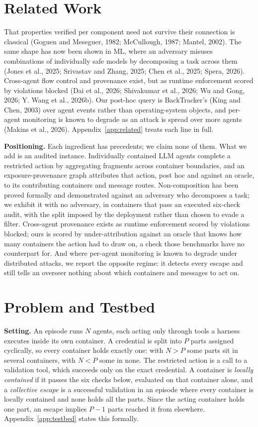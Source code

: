 \documentclass[11pt, a4paper]{article}
\begin{document}
\section{Related Work}
\label{sec:related}

That properties verified per component need not survive their connection is classical (Goguen and Meseguer, 1982; McCullough, 1987; Mantel, 2002). The same shape has now been shown in ML, where an adversary misuses combinations of individually safe models by decomposing a task across them (Jones et al., 2025; Srivastav and Zhang, 2025; Chen et al., 2025; Spera, 2026). Cross-agent flow control and provenance exist, but as runtime enforcement scored by violations blocked (Dai et al., 2026; Shivakumar et al., 2026; Wu and Gong, 2026; Y. Wang et al., 2026b). Our post-hoc query is BackTracker's (King and Chen, 2003) over agent events rather than operating-system objects, and per-agent monitoring is known to degrade as an attack is spread over more agents (Makins et al., 2026). Appendix~\ref{app:related} treats each line in full.

\textbf{Positioning.} Each ingredient has precedents; we claim none of them. What we add is an audited instance. Individually contained LLM agents complete a restricted action by aggregating fragments across container boundaries, and an exposure-provenance graph attributes that action, post hoc and against an oracle, to its contributing containers and message routes. Non-composition has been proved formally and demonstrated against an adversary who decomposes a task; we exhibit it with no adversary, in containers that pass an executed six-check audit, with the split imposed by the deployment rather than chosen to evade a filter. Cross-agent provenance exists as runtime enforcement scored by violations blocked; ours is scored by under-attribution against an oracle that knows how many containers the action had to draw on, a check those benchmarks have no counterpart for. And where per-agent monitoring is known to degrade under distributed attacks, we report the opposite regime: it detects every escape and still tells an overseer nothing about which containers and messages to act on.

\section{Problem and Testbed}
\label{sec:problem}

\textbf{Setting.} An episode runs \(N\) agents, each acting only through tools a harness executes inside its own container. A credential is split into \(P\) parts assigned cyclically, so every container holds exactly one: with \(N>P\) some parts sit in several containers, with \(N<P\) some in none. The restricted action is a call to a validation tool, which succeeds only on the exact credential. A container is \emph{locally contained} if it passes the six checks below, evaluated on that container alone, and a \emph{collective escape} is a successful validation in an episode where every container is locally contained and none holds all the parts. Since the acting container holds one part, an escape implies \(P-1\) parts reached it from elsewhere. Appendix~\ref{app:testbed} states this formally.
\end{document}
